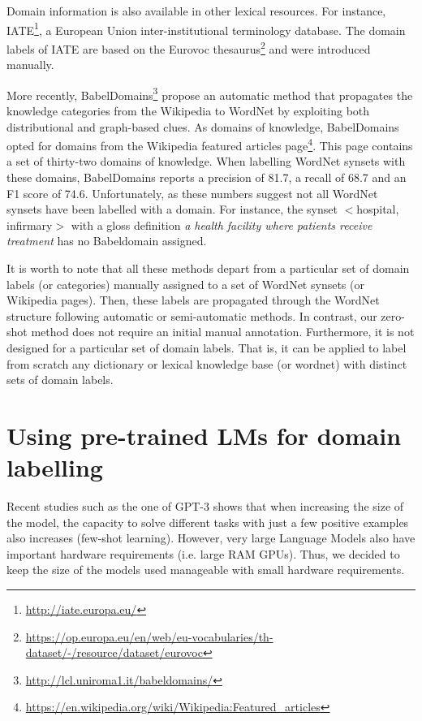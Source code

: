 \documentclass[11pt]{article}
\begin{document}
Domain information is also available in other lexical resources. For instance, IATE\footnote{\url{http://iate.europa.eu/}}, a European Union inter-institutional terminology database. The domain labels of IATE are based on the Eurovoc thesaurus\footnote{\url{https://op.europa.eu/en/web/eu-vocabularies/th-dataset/-/resource/dataset/eurovoc}} and were introduced manually.





More recently, BabelDomains\footnote{\url{http://lcl.uniroma1.it/babeldomains/}} \cite{camacho2017} propose an automatic method that propagates the knowledge categories from the Wikipedia to WordNet by exploiting both distributional and graph-based clues. As  domains  of  knowledge,  BabelDomains  opted for  domains from the Wikipedia featured articles page\footnote{\url{https://en.wikipedia.org/wiki/Wikipedia:Featured_articles}}. This  page  contains  a  set  of  thirty-two domains of knowledge. When labelling WordNet synsets with these domains, BabelDomains reports a precision of 81.7, a recall of 68.7 and an F1 score of 74.6. Unfortunately, as these numbers suggest not all WordNet synsets have been labelled with a domain. For instance, the synset $<$hospital, infirmary$>$ with a gloss definition {\it a health facility where patients receive treatment} has no Babeldomain assigned.

It is worth to note that all these methods depart from a particular set of domain labels (or categories) manually assigned to a set of WordNet synsets (or Wikipedia pages). Then, these labels are propagated through the WordNet structure following automatic or semi-automatic methods. In contrast, our zero-shot method does not require an initial manual annotation. Furthermore, it is not designed for a particular set of domain labels. That is, it can be applied to label from scratch any dictionary or lexical knowledge base (or wordnet) with distinct sets of domain labels.




\section{Using pre-trained LMs for domain labelling}
\label{methodology}

Recent studies such as the one of GPT-3 \cite{gpt-3} shows that when increasing the size of the model, the capacity to solve different tasks with just a few positive examples also increases (few-shot learning). However, very large Language Models also have important hardware requirements (i.e. large RAM GPUs). Thus, we decided to keep the size of the models used manageable with small hardware requirements.
\end{document}
